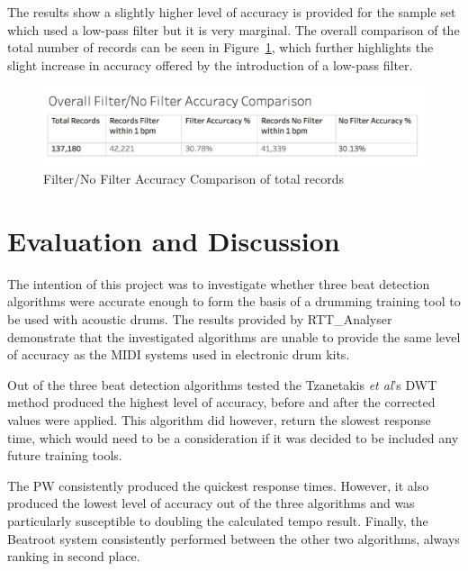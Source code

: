 \documentclass[a4paper, 11pt]{article}
\begin{document}
The results show a slightly higher level of accuracy is provided for the sample set which used a low-pass filter but it is very marginal. The overall comparison of the total number of records can be seen in Figure~\ref{fig: overFilAcc}, which further highlights the slight increase in accuracy offered by the introduction of a low-pass filter. 

\begin{figure}[h]
\centering
\includegraphics[scale=0.3]{images/OverFilAc.jpg}
\caption{Filter/No Filter Accuracy Comparison of total records}
\label{fig: overFilAcc}
\end{figure}
\clearpage
\maketitle \section{Evaluation and Discussion}
The intention of this project was to investigate whether three beat detection algorithms were accurate enough to form the basis of a drumming training tool to be used with acoustic drums. The results provided by RTT\_Analyser demonstrate that the investigated algorithms are unable to provide the same level of accuracy as the MIDI systems used in electronic drum kits.\par 

Out of the three beat detection algorithms tested the Tzanetakis \textit{et al}'s \cite{tzane1} DWT method produced the highest level of accuracy, before and after the corrected values were applied. This algorithm did however, return the slowest response time, which would need to be a consideration if it was decided to be included any future training tools.\par

The PW consistently produced the quickest response times. However, it also produced the lowest level of accuracy out of the three algorithms and was particularly susceptible to doubling the calculated tempo result. Finally, the Beatroot system consistently performed between the other two algorithms, always ranking in second place. \par
\end{document}
